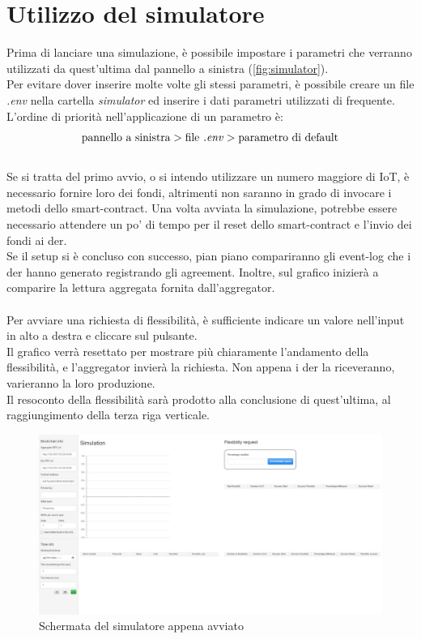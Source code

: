 \section{Utilizzo del simulatore}

Prima di lanciare una simulazione, è possibile impostare i parametri che verranno utilizzati da quest'ultima dal pannello a sinistra (\autoref{fig:simulator}). \\
Per evitare dover inserire molte volte gli stessi parametri,
è possibile creare un file \textit{.env} nella cartella \textit{simulator} ed inserire i dati parametri utilizzati di frequente. \\
L'ordine di priorità nell'applicazione di un parametro è:
$$
    \text{pannello a sinistra} > \text{file \textit{.env}} > \text{parametro di default}
$$
\\
Se si tratta del primo avvio, o si intendo utilizzare un numero maggiore di IoT, è necessario fornire loro dei fondi,
altrimenti non saranno in grado di invocare i metodi dello \gls{smart-contract}.
Una volta avviata la simulazione, potrebbe essere necessario attendere un po' di tempo per il reset dello \gls{smart-contract} e l'invio dei fondi ai \gls{der}. \\
Se il setup si è concluso con successo, pian piano compariranno gli \gls{event-log} che i \gls{der} hanno generato registrando gli \gls{agreement}.
Inoltre, sul grafico inizierà a comparire la lettura aggregata fornita dall'\gls{aggregator}. \\
\\
Per avviare una richiesta di flessibilità, è sufficiente indicare un valore nell'input in alto a destra e cliccare sul pulsante. \\
Il grafico verrà resettato per mostrare più chiaramente l'andamento della flessibilità, e l'\gls{aggregator} invierà la richiesta.
Non appena i \gls{der} la riceveranno, varieranno la loro produzione. \\
Il resoconto della flessibilità sarà prodotto alla conclusione di quest'ultima, al raggiungimento della terza riga verticale.

\begin{figure}[h]
    \includegraphics[width=\textwidth]{img/Simulator.jpg}
    \caption{Schermata del simulatore appena avviato \label{fig:simulator}}
\end{figure}

